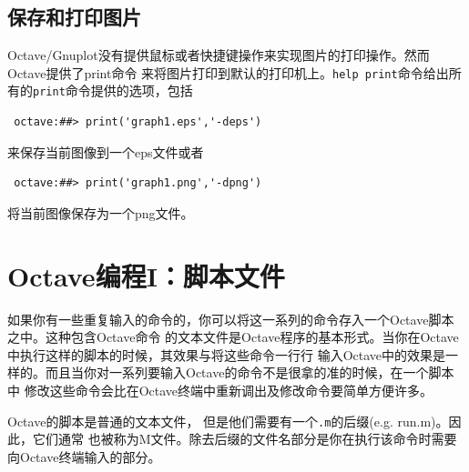 \documentclass[UTF8,adobefonts]{ctexart}
\begin{document}
\subsection{保存和打印图片}
Octave/Gnuplot没有提供鼠标或者快捷键操作来实现图片的打印操作。然而Octave提供了print命令
来将图片打印到默认的打印机上。{\tt help print}命令给出所有的{\tt print}命令提供的选项，包括
\begin{verbatim}
 octave:##> print('graph1.eps','-deps')
\end{verbatim}
来保存当前图像到一个eps文件或者
\begin{verbatim}
 octave:##> print('graph1.png','-dpng')
\end{verbatim}
将当前图像保存为一个png文件。
\section{Octave编程I：脚本文件}
如果你有一些重复输入的命令的，你可以将这一系列的命令存入一个Octave脚本之中。这种包含Octave命令
的文本文件是Octave程序的基本形式。当你在Octave中执行这样的脚本的时候，其效果与将这些命令一行行
输入Octave中的效果是一样的。而且当你对一系列要输入Octave的命令不是很拿的准的时候，在一个脚本中
修改这些命令会比在Octave终端中重新调出及修改命令要简单方便许多。

Octave的脚本是普通的文本文件， 但是他们需要有一个{\tt .m}的后缀(e.g. run.m)。因此，它们通常
也被称为M文件。除去后缀的文件名部分是你在执行该命令时需要向Octave终端输入的部分。
\end{document}

